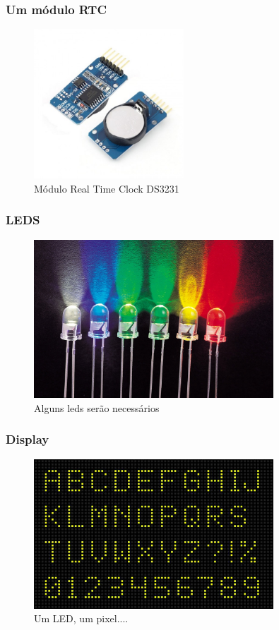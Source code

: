 \documentclass{beamer}
\begin{document}
	
	\begin{frame}
		\frametitle{Um módulo RTC}
		\begin{figure}[htb]
					\includegraphics[width=0.5\textwidth]{img/rtc.jpg}
					\caption{Módulo Real Time Clock DS3231 }
				\end{figure}
	\end{frame}
	
	\begin{frame}
		\frametitle{LEDS}
		\begin{figure}[htb]
					\includegraphics[width=0.8\textwidth]{img/leds.jpg}
					\caption{Alguns leds serão necessários}
				\end{figure}
	\end{frame}
	
	\begin{frame}
		\frametitle{Display}
		\begin{figure}[htb]
					\includegraphics[width=0.8\textwidth]{img/display.jpg}
					\caption{Um LED, um pixel....}
				\end{figure}
	\end{frame}
\end{document}
